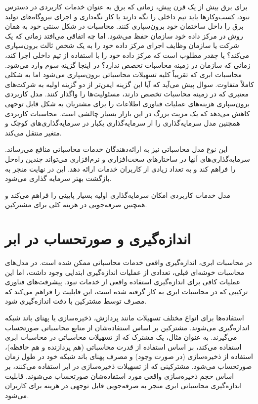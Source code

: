 \documentclass{book}
\begin{document}
                برای برق بیش از یک قرن پیش، زمانی که برق به عنوان خدمات کاربردی در دسترس نبود، کسب‌وکارها باید تیم داخلی را نگه دارند یا کار نگه‌داری و اجرای نیروگاه‌های تولید برق را داخل ساختمان خود برون‌سپاری کنند. محاسبات در شکل سنتی خود به همان روش در مرکز داده خود سازمان حفظ می‌شود. اما چه اتفاقی می‌افتد زمانی که یک شرکت یا سازمان وظایف اجرای مرکز داده خود را به یک شخص ثالث برون‌سپاری می‌کند؟ یا چقدر مطلوب است که مرکز داده خود را با استفاده از تیم داخلی اجرا کند، زمانی که سازمان در زمینه محاسبات تخصص ندارد؟ در اینجا گزینه سوم وارد می‌شود. محاسبات ابری که تقریباً کلیه تسهیلات محاسباتی برون‌سپاری می‌شود اما به شکلی کاملاً متفاوت. سوال پیش می‌آید که آیا این گزینه ایمن‌تر از دو گزینه اولیه به شرکت‌های معتبری که در زمینه محاسبات تخصص دارند، مسئولیت‌ها را واگذار کنند. مدل کاربردی برون‌سپاری هزینه‌های عملیات فناوری اطلاعات را برای مشتریان به شکل قابل توجهی کاهش می‌دهد که یک مزیت بزرگ در این بازار بسیار چالشی است. محاسبات کاربردی همچنین مدل سرمایه‌گذاری را از سرمایه‌گذاری یکبار در سرمایه‌گذاری‌های کوچک و متغیر منتقل می‌کند.
            
                این نوع مدل محاسباتی نیز به ارائه‌دهندگان خدمات محاسباتی منافع می‌رساند. سرمایه‌گذاری‌های آنها در ساختارهای سخت‌افزاری و نرم‌افزاری می‌تواند چندین راه‌حل را فراهم کند و به تعداد زیادی از کاربران خدمات ارائه دهد. این در نهایت منجر به بازگشت بهتر سرمایه گذاری می‌شود.

                \begin{addinfo}
                    
                    مدل خدمات کاربردی امکان سرمایه‌گذاری اولیه بسیار پایینی را فراهم می‌کند و همچنین صرفه‌جویی در هزینه کلی برای مشترکین.

                \end{addinfo}

        \section{اندازه‌گیری و صورتحساب در ابر}

            در محاسبات ابری، اندازه‌گیری واقعی خدمات محاسباتی ممکن شده است. در مدل‌های محاسبات خوشه‌ای قبلی، تعدادی از عملیات اندازه‌گیری ابتدایی وجود داشت، اما این عملیات کافی برای اندازه‌گیری استفاده واقعی از خدمات نبود. پیشرفت‌های فناوری ترکیبی که در محاسبات ابری به کار گرفته شده است، این قابلیت را فراهم می‌کند که مصرف توسط مشترکین با دقت اندازه‌گیری شود.

            استفاده‌ها برای انواع مختلف تسهیلات مانند پردازش، ذخیره‌سازی یا پهنای باند شبکه اندازه‌گیری می‌شوند. مشترکین بر اساس استفاده‌شان از منابع محاسباتی صورتحساب می‌گیرند. به عنوان مثال، یک مشترک که از تسهیلات محاسباتی در محاسبات ابری استفاده می‌کند، بر اساس استفاده از قدرت محاسباتی (هم پردازنده و هم حافظه)، استفاده از ذخیره‌سازی (در صورت وجود) و مصرف پهنای باند شبکه خود در طول زمان صورتحساب می‌شود. مشترکینی که از تسهیلات ذخیره‌سازی در ابر استفاده می‌کنند، بر اساس حجم ذخیره‌سازی واقعی مورد استفاده‌شان صورتحساب می‌شوند. قابلیت اندازه‌گیری محاسباتی ابری منجر به صرفه‌جویی قابل توجهی در هزینه برای کاربران می‌شود.
\end{document}
